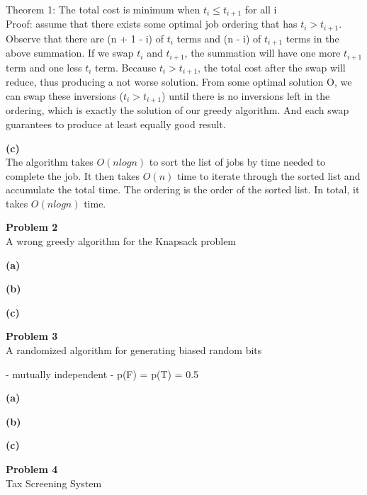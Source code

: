 \documentclass[12pt,article]{article}
\newenvironment{problem}[2][Problem]
    { \begin{mdframed}[backgroundcolor=gray!20] \textbf{#1 #2} \\}
    {  \end{mdframed}}
\begin{document}
Theorem 1: The total cost is minimum when $t_i \leq t_{i+1}$ for all i \\
Proof: assume that there exists some optimal job ordering that has $t_i > t_{i+1}$. Observe that there are (n + 1 - i) of $t_i$ terms and (n - i) of $t_{i+1}$ terms in the above summation. If we swap $t_i$ and $t_{i+1}$, the summation will have one more $t_{i+1}$ term and one less $t_i$ term. Because $t_i > t_{i+1}$, the total cost after the swap will reduce, thus producing a not worse solution. From some optimal solution O, we can swap these inversions ($t_{i} > t_{i+1}$) until there is no inversions left in the ordering, which is exactly the solution of our greedy algorithm. And each swap guarantees to produce at least equally good result.

\textbf{(c)} \\
The algorithm takes $O(nlogn)$ to sort the list of jobs by time needed to complete the job. It then takes $O(n)$ time to iterate through the sorted list and accumulate the total time. The ordering is the order of the sorted list. In total, it takes $O(nlogn)$ time.

\newpage
\begin{problem}{2} 
A wrong greedy algorithm for the Knapsack problem 
\end{problem}

\textbf{(a)}

\textbf{(b)}

\textbf{(c)}

\newpage
\begin{problem}{3} 
A randomized algorithm for generating biased random bits
\end{problem}
- mutually independent
- p(F) = p(T) = 0.5



\textbf{(a)}

\textbf{(b)}

\textbf{(c)}

\newpage
\begin{problem}{4} 
Tax Screening System
\end{problem}



\end{document}
